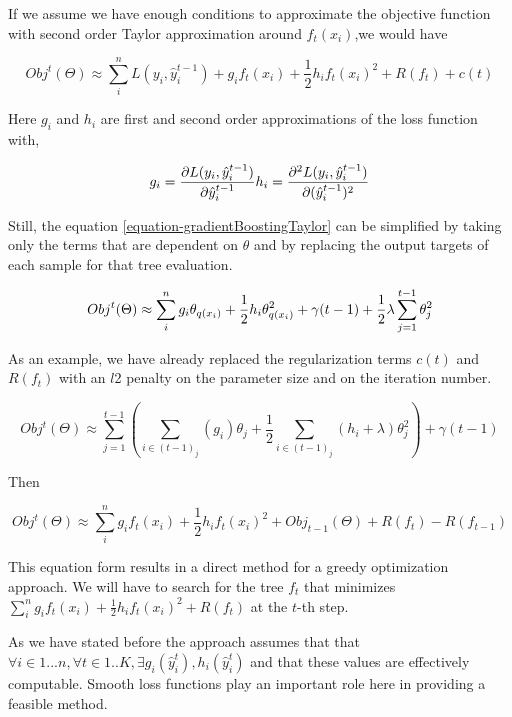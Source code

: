 \documentclass{article}%
\theoremstyle{definition}
\begin{document}
If we assume we have enough conditions to approximate the objective function with  second order Taylor approximation around $f_t(x_i)$,we would have

\begin{equation}\label{equation-gradientBoostingTaylor}
Obj^t(\Theta) \approx \sum_i^n {L(y_i, \hat{y}^{t-1}_i) + g_i f_t(x_i) + \frac{1}{2} h_i f_t(x_i)^2 } +  R(f_t) +  c(t)
\end{equation}

Here $g_i$ and $h_i$ are first and second order approximations of the loss function with,

\[
g_i =  \frac{\partial L(y_i, \hat{y}^{t-1}_i)}{\partial \hat{y}^{t-1}_i} \\
h_i =  \frac{\partial^2 L(y_i, \hat{y}^{t-1}_i)}{\partial (\hat{y}^{t-1}_i)^2 }
\]

Still, the equation \ref{equation-gradientBoostingTaylor} can be simplified by taking only the terms that are dependent on $\theta$ and by replacing the output targets of each sample for that tree evaluation.

\begin{equation} \label{eq:gb-objSteps1}
Obj^t(\Theta) \approx  \sum_i^n {g_i \theta_{q(x_i)} + \frac{1}{2} h_i \theta_{q(x_i)}^2 } + \gamma ({t-1}) + \frac{1}{2}\lambda \sum_{j=1}^{t-1} \theta_j^2 \\
\end{equation}

As an example, we have already replaced the regularization terms $c(t)$ and $R(f_t)$ with an $l$2 penalty on the parameter size and on the iteration number. 

\begin{equation} \label{eq:gb-objSteps1}
Obj^t(\Theta) \approx   \sum_{j=1}^{t-1} \left(  \sum_{i \in ({t-1})_j} (g_i )\theta_{j} + \frac{1}{2} \sum_{i \in ({t-1})_j} (h_i + \lambda ) \theta_{j}^2  \right) + \gamma ({t-1})
\end{equation}

Then

\[
Obj^t(\Theta) \approx \sum_i^n {  g_i f_t(x_i) + \frac{1}{2} h_i f_t(x_i)^2 } +  Obj_{t-1}(\Theta) + R(f_t) - R(f_{t-1})
\]

This equation form results in a direct method for a greedy optimization approach.  We will have to search for the tree $f_t$ that minimizes \\
$\sum_i^n {  g_i f_t(x_i) + \frac{1}{2} h_i f_t(x_i)^2 } + R(f_t)$ at the $t$-th step. 

As we have stated before the approach assumes that that $ \forall i \in {1...n}, \forall t \in {1..K}, \exists g_i(\hat{y}^{t}_i), h_i(\hat{y}^{t}_i) $ and that these values are effectively computable. Smooth loss functions play an important role here in providing a feasible method. 
\end{document}
